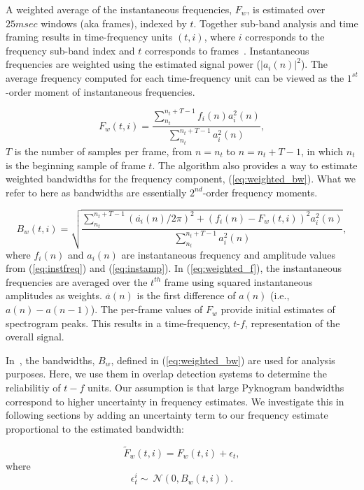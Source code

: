 {A weighted average of the instantaneous frequencies, $F_w$, is estimated over $25msec$ windows (aka frames), indexed by $t$. 
Together sub-band analysis and time framing results in time-frequency units $(t,i)$, where $i$ corresponds to the frequency sub-band index and $t$ corresponds to frames~\cite{cohenlee90}.
Instantaneous frequencies are weighted using the estimated signal power ($|a_i(n)|^2$). 
The average frequency computed for each time-frequency unit can be viewed as the $1^{st}$-order moment of instantaneous frequencies.  


\begin{equation}
\label{eq:weighted_f}
F_w(t,i) = \frac{\sum_{n_t}^{n_t+T - 1}f_i(n)a_i^2(n)}{\sum_{n_t}^{n_t+T - 1}a_i^2(n)},
\end{equation}
$T$ is the number of samples per frame, from $n = n_t$ to $n = n_t+T - 1$, in which $n_t$ is the beginning sample of frame $t$. 
The algorithm also provides a way to estimate weighted bandwidths for the frequency component, (\ref{eq:weighted_bw}). 
What we refer to here as bandwidths are essentially $2^{nd}$-order frequency moments. 

\begin{equation}
\label{eq:weighted_bw}
B_w(t,i) = \sqrt{\frac{\sum_{n_t}^{n_t+T-1}(\overset{\boldsymbol .}{a_i}(n) /2\pi)^2+(f_i(n)-F_w(t,i))^2a_i^2(n)}{\sum_{n_t}^{n_t+T-1}a_i^2(n)}},
\end{equation}
where $f_i(n)$ and $a_i(n)$ are instantaneous frequency and amplitude values from (\ref{eq:instfreq}) and (\ref{eq:instamp}). 
In (\ref{eq:weighted_f}), the instantaneous frequencies are averaged over the $t^{th}$ frame using squared instantaneous amplitudes as weights. 
$\overset{\boldsymbol .}{a}(n)$ is the first difference of $a(n)$ (i.e., $a(n) - a(n-1)$). 
The per-frame values of $F_w$ provide initial estimates of spectrogram peaks. 
This results in a time-frequency, {$t$-$f$}, representation of the overall signal. 


In~\cite{potamianos_maragos_jasa96}, the bandwidths, $B_w$, defined in (\ref{eq:weighted_bw}) are used for analysis purposes. 
Here, we use them in overlap detection systems to determine the reliabilitiy of $t-f$ units. 
Our assumption is that large Pyknogram bandwidths correspond to higher uncertainty in frequency estimates. 
We investigate this in following sections by adding an uncertainty term to our frequency estimate proportional to the estimated bandwidth:



\begin{equation}
\label{eq:jitter_f}
\tilde F_w(t,i) = F_w(t,i) + \epsilon_t,
\end{equation}
where
\begin{equation}
\label{eq:jitter_pdf}
\epsilon^i_t \sim\ \mathcal{N}(0,B_w(t,i)).
\end{equation}

}
